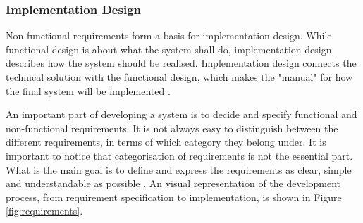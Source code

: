 \subsubsection{Implementation Design}
Non-functional requirements form a basis for implementation design. While functional design is about what the system shall do, implementation design describes how the system should be realised. Implementation design connects the technical solution with the functional design, which makes the "manual" for how the final system will be implemented \cite{systemutviklingDel1}.  

An important part of developing a system is to decide and specify functional and non-functional requirements. It is not always easy to distinguish between the different requirements, in terms of which category they belong under. It is important to notice that categorisation of requirements is not the essential part. What is the main goal is to define and express the requirements as clear, simple and understandable as possible \cite{systemutviklingDel1}. An visual representation of the development process, from requirement specification to implementation, is shown in Figure \ref{fig:requirements}.  

